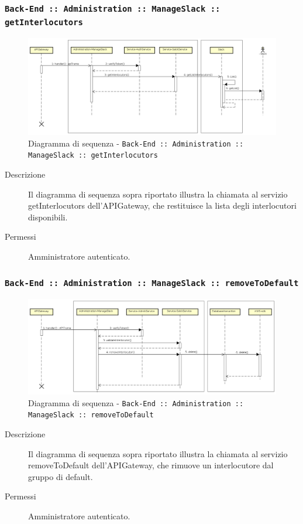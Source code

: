 \documentclass[../DefinizioneDiProdotto_v3.0.0.tex]{subfiles}
\begin{document}
\newpage
\subsubsection{\texttt{Back-End :: Administration :: ManageSlack :: getInterlocutors}}
\begin{figure}[!h]
	\centering
	\includegraphics[width=\textwidth]{DiagrammiSequenza/Back-End/manageSlack/getInterlocutors.png}
	\caption{Diagramma di sequenza - \texttt{Back-End :: Administration :: ManageSlack :: getInterlocutors}}
\end{figure}
\begin{description}
	\item [Descrizione] Il diagramma di sequenza sopra riportato illustra la chiamata al servizio getInterlocutors dell'APIGateway, che restituisce la lista degli interlocutori disponibili.
	\item [Permessi] Amministratore autenticato.
\end{description}

\subsubsection{\texttt{Back-End :: Administration :: ManageSlack :: removeToDefault}}
\begin{figure}[!h]
	\centering
	\includegraphics[width=\textwidth]{DiagrammiSequenza/Back-End/manageSlack/removeToDefault.png}
	\caption{Diagramma di sequenza - \texttt{Back-End :: Administration :: ManageSlack :: removeToDefault }}
\end{figure}
\begin{description}
	\item [Descrizione] Il diagramma di sequenza sopra riportato illustra la chiamata al servizio removeToDefault dell'APIGateway, che rimuove un interlocutore dal gruppo di default.
	\item [Permessi] Amministratore autenticato.
\end{description}
\end{document}
